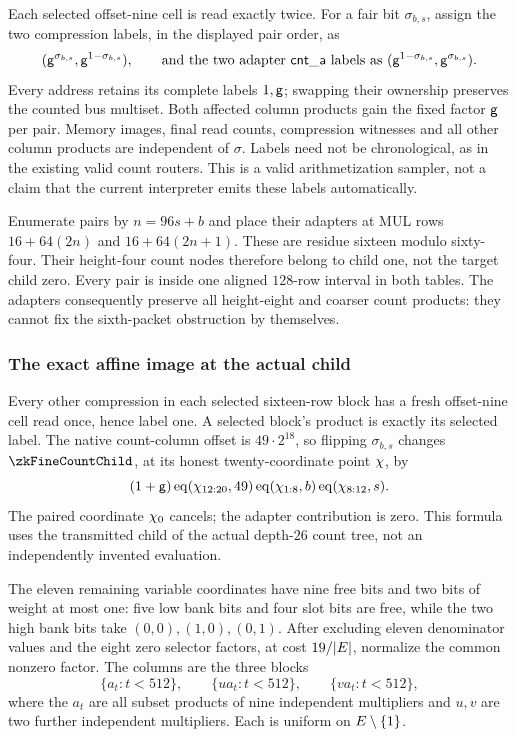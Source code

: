 Each selected offset-nine cell is read exactly twice. For a fair bit $\sigma_{b,s}$, assign the two compression labels, in the displayed pair order, as
\[
 (\mathsf{g}^{\sigma_{b,s}},\mathsf{g}^{1-\sigma_{b,s}}),
 \qquad\text{and the two adapter }\mathsf{cnt\_a}\text{ labels as }
 (\mathsf{g}^{1-\sigma_{b,s}},\mathsf{g}^{\sigma_{b,s}}).
\]
Every address retains its complete labels $1,\mathsf{g}$; swapping their ownership preserves the counted bus multiset. Both affected column products gain the fixed factor $\mathsf{g}$ per pair. Memory images, final read counts, compression witnesses and all other column products are independent of $\sigma$. Labels need not be chronological, as in the existing valid count routers. This is a valid arithmetization sampler, not a claim that the current interpreter emits these labels automatically.

Enumerate pairs by $n=96s+b$ and place their adapters at MUL rows $16+64(2n)$ and $16+64(2n+1)$. These are residue sixteen modulo sixty-four. Their height-four count nodes therefore belong to child one, not the target child zero. Every pair is inside one aligned $128$-row interval in both tables. The adapters consequently preserve all height-eight and coarser count products: they cannot fix the sixth-packet obstruction by themselves.

\subsubsection{The exact affine image at the actual child}

Every other compression in each selected sixteen-row block has a fresh offset-nine cell read once, hence label one. A selected block's product is exactly its selected label. The native count-column offset is $49\cdot2^{18}$, so flipping $\sigma_{b,s}$ changes $\zkFineCountChild$, at its honest twenty-coordinate point $\chi$, by
\[
 (1+\mathsf{g})\operatorname{eq}(\chi_{12:20},49)
       \operatorname{eq}(\chi_{1:8},b)\operatorname{eq}(\chi_{8:12},s).
\]
The paired coordinate $\chi_0$ cancels; the adapter contribution is zero. This formula uses the transmitted child of the actual depth-$26$ count tree, not an independently invented evaluation.

The eleven remaining variable coordinates have nine free bits and two bits of weight at most one: five low bank bits and four slot bits are free, while the two high bank bits take $(0,0),(1,0),(0,1)$. After excluding eleven denominator values and the eight zero selector factors, at cost $19/|E|$, normalize the common nonzero factor. The columns are the three blocks
\[
 \{a_t:t<512\},\qquad \{u a_t:t<512\},\qquad
 \{v a_t:t<512\},
\]
where the $a_t$ are all subset products of nine independent multipliers and $u,v$ are two further independent multipliers. Each is uniform on $E\setminus\{1\}$.

